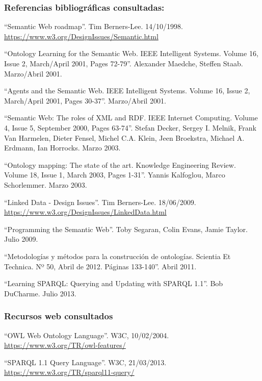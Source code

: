 
\subsubsection*{Referencias bibliográficas consultadas:}

 ``Semantic Web roadmap''. Tim Berners-Lee. 14/10/1998. \url{https://www.w3.org/DesignIssues/Semantic.html}

 ``Ontology Learning for the Semantic Web. IEEE Intelligent Systems. Volume 16, Issue 2, March/April 2001, Pages 72-79''. Alexander Maedche, Steffen Staab. Marzo/Abril 2001.

 ``Agents and the Semantic Web. IEEE Intelligent Systems. Volume 16, Issue 2, March/April 2001, Pages 30-37''. Marzo/Abril 2001.

 ``Semantic Web: The roles of XML and RDF. IEEE Internet Computing. Volume 4, Issue 5, September 2000, Pages 63-74''. Stefan Decker, Sergey I. Melnik, Frank Van Harmelen, Dieter Fensel, Michel C.A. Klein, Jeen Broekstra, Michael A. Erdmann, Ian Horrocks. Marzo 2003.

 ``Ontology mapping: The state of the art. Knowledge Engineering Review. Volume 18, Issue 1, March 2003, Pages 1-31''. Yannis Kalfoglou, Marco Schorlemmer. Marzo 2003.

 ``Linked Data - Design Issues''. Tim Berners-Lee. 18/06/2009. \url{https://www.w3.org/DesignIssues/LinkedData.html}

 ``Programming the Semantic Web''. Toby Segaran, Colin Evans, Jamie Taylor. Julio 2009.

 ``Metodologías y métodos para la construcción de ontologías. Scientia Et Technica. Nº 50, Abril de 2012. Páginas 133-140''. Abril 2011.

 ``Learning SPARQL: Querying and Updating with SPARQL 1.1''. Bob DuCharme. Julio 2013.

\bigskip
\subsubsection*{Recursos web consultados}

 ``OWL Web Ontology Language''. W3C, 10/02/2004. \url{https://www.w3.org/TR/owl-features/}

 ``SPARQL 1.1 Query Language''. W3C, 21/03/2013. \url{https://www.w3.org/TR/sparql11-query/}

